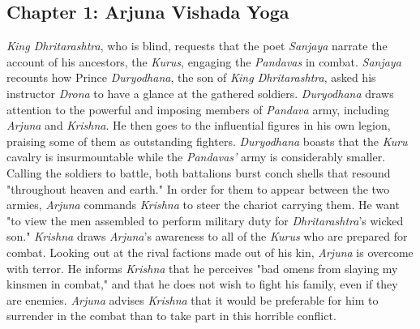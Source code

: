 \documentclass[runningheads]{llncs}
\begin{document}
\subsection{Chapter 1: Arjuna Vishada Yoga}
\textit{King Dhritarashtra}, who is blind, requests that the poet \textit{Sanjaya} narrate the account of his ancestors, the \textit{Kurus}, engaging the \textit{Pandavas} in combat. \textit{Sanjaya} recounts how Prince \textit{Duryodhana}, the son of \textit{King Dhritarashtra}, asked his instructor \textit{Drona} to have a glance at the gathered soldiers. \textit{Duryodhana} draws attention to the powerful and imposing members of \textit{Pandava} army, including \textit{Arjuna} and \textit{Krishna}. He then goes to the influential figures in his own legion, praising some of them as outstanding fighters. \textit{Duryodhana} boasts that the \textit{Kuru} cavalry is insurmountable while the \textit{Pandavas'} army is considerably smaller. Calling the soldiers to battle, both battalions burst conch shells that resound "throughout heaven and earth." In order for them to appear between the two armies, \textit{Arjuna} commands \textit{Krishna} to steer the chariot carrying them. He want "to view the men assembled to perform military duty for \textit{Dhritarashtra}'s wicked son." \textit{Krishna} draws \textit{Arjuna}'s awareness to all of the \textit{Kurus} who are prepared for combat. Looking out at the rival factions made out of his kin, \textit{Arjuna} is overcome with terror. He informs \textit{Krishna} that he perceives "bad omens from slaying my kinsmen in combat," and that he does not wish to fight his family, even if they are enemies. \textit{Arjuna} advises \textit{Krishna} that it would be preferable for him to surrender in the combat than to take part in this horrible conflict. 
\end{document}

